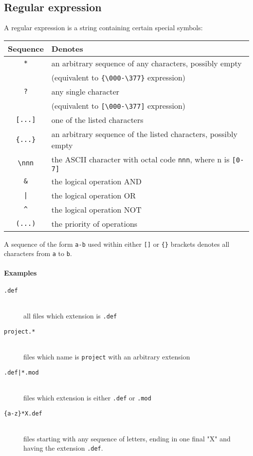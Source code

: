 \subsection{Regular expression}\label{xc:regexpr}

A regular expression is a string  containing  certain  special  symbols:

\begin{center}
\begin{tabular}{cl}
\bf Sequence & \bf Denotes \\
\hline
\verb+*+     & an arbitrary sequence of any characters, possibly empty \\
             & (equivalent to \verb|{\000-\377}| expression) \\
\verb+?+     & any single character \\
             & (equivalent to \verb|[\000-\377]| expression) \\
\verb+[...]+ & one of the listed characters \\
\verb+{...}+ & an arbitrary sequence of the listed characters, possibly empty \\
\verb+\nnn+  & the ASCII character with octal code \verb|nnn|, where n is \verb|[0-7]| \\
\verb+&+     & the logical operation AND \\
\verb+|+     & the logical operation OR  \\
\verb+^+     & the logical operation NOT \\
\verb+(...)+ & the priority of operations
\end{tabular}
\end{center}

A  sequence of the  form \verb|a-b|  used  within  either
\verb|[]| or \verb|{}| brackets denotes all characters from
\verb|a| to \verb|b|.

\paragraph{Examples}
\begin{description}

\item[{\tt *.def}] \mbox{} \\
    all files which extension is {\tt .def}

\item[{\tt project.*}] \mbox{} \\
    files which name is {\tt project} with an arbitrary extension

\item[{\tt *.def|*.mod}] \mbox{} \\
    files which extension is either {\tt .def} or {\tt .mod}

\item[{\tt \{a-z\}*X.def}] \mbox{} \\
    files starting with any sequence of letters,
    ending in one final "X" and having the extension \verb|.def|.
\end{description}

